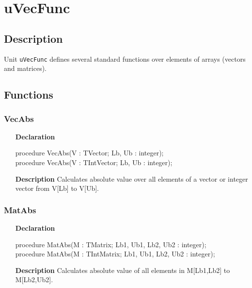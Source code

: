 \documentclass[12pt,a4paper,oneside]{report}
\newcommand{\lmath}[1]{   %
	\marginpar{\vspace{#1} 
		\begin{flushright}
			LMath
	\end{flushright} }
}
\newcommand{\declarationitem}[1]{\textbf{#1}}
\newcommand{\descriptiontitle}[1]{\textbf{#1}}
\newcommand{\code}[1]{\texttt{#1}}
\begin{document}
\section{uVecFunc}\lmath{-28pt}
\subsection{Description}
Unit \code{uVecFunc} defines several standard functions over elements of arrays (vectors and matrices).
\subsection{Functions} 
\subsubsection{VecAbs}
\label{uvecfunc:VecAbs}
\begin{itemize}
	\item[\declarationitem{Declaration}\hfill]
	\begin{flushleft}
procedure VecAbs(V : TVector; Lb, Ub : integer);\\ \vspace{4pt}	
procedure VecAbs(V : TIntVector; Lb, Ub : integer);
	\end{flushleft}
	\item[\descriptiontitle{Description}\hfill]
	Calculates absolute value over all elements of a vector or integer vector from V[Lb] to V[Ub].
\end{itemize}
\subsubsection{MatAbs}
\label{uvecfunc:MatAbs}
\begin{itemize}
	\item[\declarationitem{Declaration}\hfill]
	\begin{flushleft}
procedure MatAbs(M : TMatrix; Lb1, Ub1, Lb2, Ub2 : integer);\\ \vspace{4pt}	 
procedure MatAbs(M : TIntMatrix; Lb1, Ub1, Lb2, Ub2 : integer);
	\end{flushleft}
	\item[\descriptiontitle{Description}\hfill]
	Calculates absolute value of all elements in M[Lb1,Lb2] to M[Lb2,Ub2].
\end{itemize}
\end{document}
